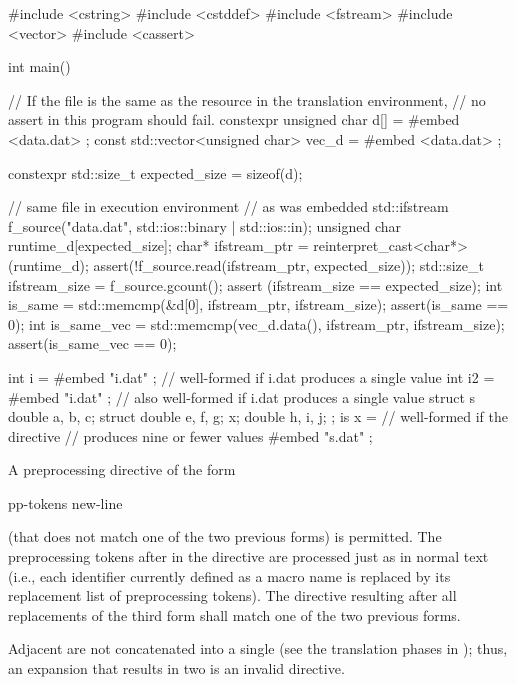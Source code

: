 \begin{example}
\begin{codeblock}
#include <cstring>
#include <cstddef>
#include <fstream>
#include <vector>
#include <cassert>

int main() {
  // If the file is the same as the resource in the translation environment,
  // no assert in this program should fail.
  constexpr unsigned char d[] = {
#embed <data.dat>
  };
  const std::vector<unsigned char> vec_d = {
#embed <data.dat>
  };

  constexpr std::size_t expected_size = sizeof(d);

  // same file in execution environment
  // as was embedded
  std::ifstream f_source("data.dat", std::ios::binary | std::ios::in);
  unsigned char runtime_d[expected_size];
  char* ifstream_ptr = reinterpret_cast<char*>(runtime_d);
  assert(!f_source.read(ifstream_ptr, expected_size));
  std::size_t ifstream_size = f_source.gcount();
  assert (ifstream_size == expected_size);
  int is_same = std::memcmp(&d[0], ifstream_ptr, ifstream_size);
  assert(is_same == 0);
  int is_same_vec = std::memcmp(vec_d.data(), ifstream_ptr, ifstream_size);
  assert(is_same_vec == 0);
}
\end{codeblock}
\end{example}

\begin{example}
\begin{codeblock}
int i = {
#embed "i.dat"
};  // well-formed if i.dat produces a single value
int i2 =
#embed "i.dat"
;   // also well-formed if i.dat produces a single value
struct s {
  double a, b, c;
  struct { double e, f, g; } x;
  double h, i, j;
};
is x = {
// well-formed if the directive
// produces nine or fewer values
#embed "s.dat"
};
\end{codeblock}
\end{example}

\pnum
A preprocessing directive of the form
\begin{ncsimplebnf}
 pp-tokens new-line
\end{ncsimplebnf}
(that does not match one of the two previous forms) is permitted.
The preprocessing tokens after  in the directive are processed
just as in normal text (i.e., each identifier currently defined as a macro
name is replaced by its replacement list of preprocessing tokens).
The directive resulting after all replacements of the third form shall match
one of the two previous forms.
\begin{note}
Adjacent  are not concatenated into a single
 (see the translation phases in );
thus, an expansion that results in two  is an
invalid directive.
\end{note}

